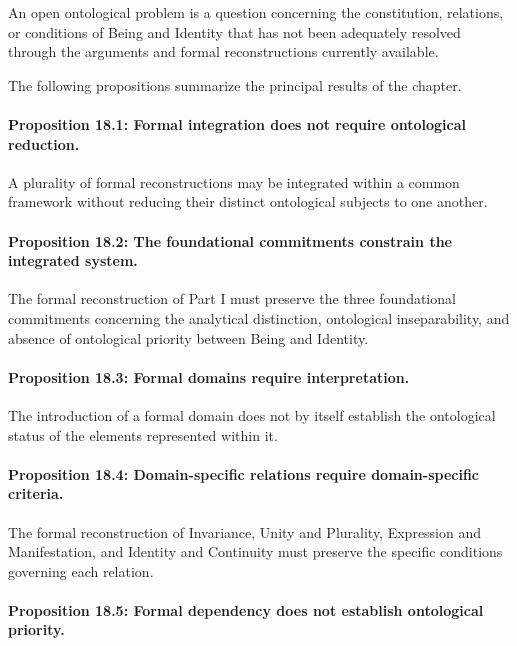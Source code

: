 An open
ontological problem
is a
question concerning
the constitution,
relations, or
conditions of
Being and
Identity that
has not
been adequately
resolved through
the arguments
and formal
reconstructions
currently available.

The following
propositions summarize
the principal
results of
the chapter.

\paragraph{Proposition 18.1: Formal integration does not require ontological reduction.}

A plurality
of formal
reconstructions may
be integrated
within a
common framework
without reducing
their distinct
ontological subjects
to one
another.

\paragraph{Proposition 18.2: The foundational commitments constrain the integrated system.}

The formal
reconstruction of
Part I must
preserve the
three foundational
commitments concerning
the analytical
distinction, ontological
inseparability, and
absence of
ontological priority
between Being
and Identity.

\paragraph{Proposition 18.3: Formal domains require interpretation.}

The introduction
of a
formal domain
does not
by itself
establish the
ontological status
of the
elements represented
within it.

\paragraph{Proposition 18.4: Domain-specific relations require domain-specific criteria.}

The formal
reconstruction of
Invariance, Unity
and Plurality,
Expression and
Manifestation, and
Identity and
Continuity must
preserve the
specific conditions
governing each
relation.

\paragraph{Proposition 18.5: Formal dependency does not establish ontological priority.}

